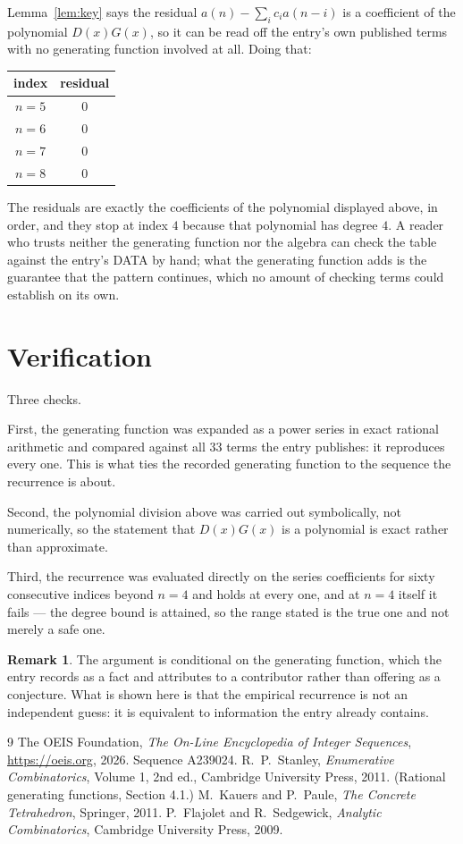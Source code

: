 \documentclass[11pt,a4paper]{article}
\theoremstyle{plain}
\theoremstyle{definition}
\newtheorem{remark}[theorem]{Remark}
\begin{document}
Lemma~\ref{lem:key} says the residual $a(n)-\sum_ic_ia(n-i)$ is a coefficient of the
polynomial $D(x)G(x)$, so it can be read off the entry's own published terms with no
generating function involved at all. Doing that:
\begin{center}
\begin{tabular}{cc}
index & residual \\ \hline
$n=5$ & $0$ \\
$n=6$ & $0$ \\
$n=7$ & $0$ \\
$n=8$ & $0$
\end{tabular}
\end{center}
The residuals are exactly the coefficients of the polynomial displayed above, in order, and
they stop at index $4$ because that polynomial has degree $4$. A reader who trusts
neither the generating function nor the algebra can check the table against the entry's DATA
by hand; what the generating function adds is the guarantee that the pattern continues, which
no amount of checking terms could establish on its own.

\section{Verification}

Three checks.

First, the generating function was expanded as a power series in exact rational arithmetic and
compared against all $33$ terms the entry publishes: it reproduces every one. This is
what ties the recorded generating function to the sequence the recurrence is about.

Second, the polynomial division above was carried out symbolically, not numerically, so the
statement that $D(x)G(x)$ is a polynomial is exact rather than approximate.

Third, the recurrence was evaluated directly on the series coefficients for sixty consecutive
indices beyond $n=4$ and holds at every one, and at $n=4$ itself it fails --- the
degree bound is attained, so the range stated is the true one and not merely a safe one.

\begin{remark}
The argument is conditional on the generating function, which the entry records as a fact and
attributes to a contributor rather than offering as a conjecture. What is shown here is that
the empirical recurrence is not an independent guess: it is equivalent to information the
entry already contains.
\end{remark}

\begin{thebibliography}{9}
 The OEIS Foundation, \emph{The On-Line Encyclopedia of Integer
Sequences}, \url{https://oeis.org}, 2026. Sequence A239024.
 R.~P.~Stanley, \emph{Enumerative Combinatorics}, Volume 1, 2nd ed.,
Cambridge University Press, 2011. (Rational generating functions, Section 4.1.)
 M.~Kauers and P.~Paule, \emph{The Concrete Tetrahedron}, Springer, 2011.
 P.~Flajolet and R.~Sedgewick, \emph{Analytic Combinatorics}, Cambridge
University Press, 2009.
\end{thebibliography}
\end{document}
